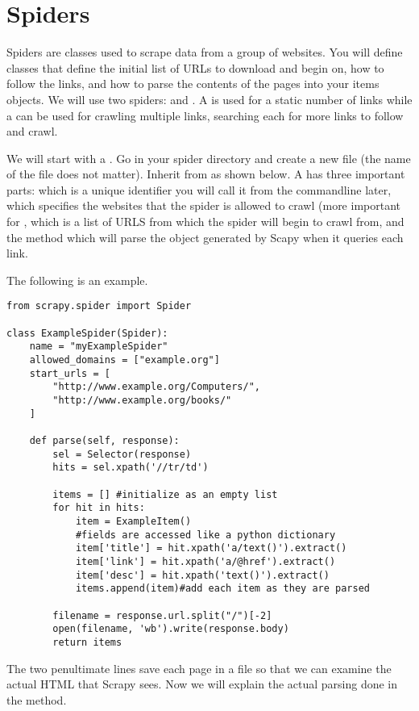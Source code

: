 \section*{Spiders}
Spiders are classes used to scrape data from a group of websites. 
You will define classes that define the initial list of URLs to download and begin on, how to follow the links, and how to parse the contents of the pages into your items objects.
We will use two spiders:  and . 
A  is used for a static number of links while a  can be used for crawling multiple links, searching each for more links to follow and crawl.

We will start with a . 
Go in your spider directory and create a new file (the name of the file does not matter). 
Inherit from  as shown below. 
A  has three important parts:  which is a unique identifier you will call it from the commandline later,  which specifies the websites that the spider is allowed to crawl (more important for ,  which is a list of URLS from which the spider will begin to crawl from, and the method  which will parse the  object generated by Scapy when it queries each link. 

The following is an example.
\begin{lstlisting}
from scrapy.spider import Spider

class ExampleSpider(Spider):
    name = "myExampleSpider"
    allowed_domains = ["example.org"]
    start_urls = [
        "http://www.example.org/Computers/",
        "http://www.example.org/books/"
    ]

    def parse(self, response):
        sel = Selector(response)
        hits = sel.xpath('//tr/td')

        items = [] #initialize as an empty list
        for hit in hits:
            item = ExampleItem()
            #fields are accessed like a python dictionary
            item['title'] = hit.xpath('a/text()').extract()
            item['link'] = hit.xpath('a/@href').extract()
            item['desc'] = hit.xpath('text()').extract()
            items.append(item)#add each item as they are parsed

        filename = response.url.split("/")[-2]
        open(filename, 'wb').write(response.body)
        return items

\end{lstlisting}
The two penultimate lines save each page in a file so that we can examine the actual HTML that Scrapy sees.
Now we will explain the actual parsing done in the  method.

